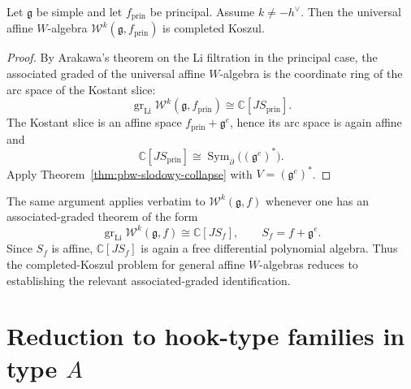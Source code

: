 \begin{corollary}
\label{cor:principal-w-completed-koszul}
Let $\mathfrak g$ be simple and let $f_{\mathrm{prin}}$ be principal.  Assume
$k\neq -h^\vee$.  Then the universal affine $W$-algebra
$\mathcal W^k(\mathfrak g,f_{\mathrm{prin}})$ is completed Koszul.
\end{corollary}

\begin{proof}
By Arakawa's theorem on the Li filtration in the principal case, the associated
graded of the universal affine $W$-algebra is the coordinate ring of the arc
space of the Kostant slice:
\[
\operatorname{gr}_{\mathrm{Li}}\mathcal W^k(\mathfrak g,f_{\mathrm{prin}})
\cong \mathbb C[J S_{\mathrm{prin}}].
\]
The Kostant slice is an affine space $f_{\mathrm{prin}}+\mathfrak g^e$, hence
its arc space is again affine and
\[
\mathbb C[J S_{\mathrm{prin}}]
\cong \operatorname{Sym}_{\partial}\bigl((\mathfrak g^e)^*\bigr).
\]
Apply Theorem~\ref{thm:pbw-slodowy-collapse} with
$V=(\mathfrak g^e)^*$.
\end{proof}

\begin{remark}
\label{rem:arbitrary-nilpotent-conditional}
The same argument applies verbatim to $\mathcal W^k(\mathfrak g,f)$ whenever one
has an associated-graded theorem of the form
\[
\operatorname{gr}_{\mathrm{Li}}\mathcal W^k(\mathfrak g,f)
\cong \mathbb C[J S_f],
\qquad
S_f=f+\mathfrak g^e.
\]
Since $S_f$ is affine, $\mathbb C[J S_f]$ is again a free differential
polynomial algebra.  Thus the completed-Koszul problem for general affine
$W$-algebras reduces to establishing the relevant associated-graded
identification.
\end{remark}

\section{Reduction to hook-type families in type \texorpdfstring{$A$}{A}}

